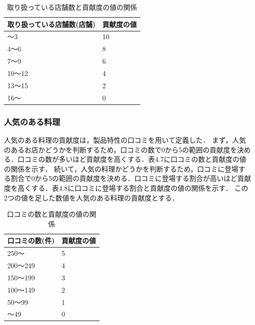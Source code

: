 \documentclass{funthesis}
\begin{document}
\begin{table}[htb]
  \begin{center}
  \scriptsize
    \caption{取り扱っている店舗数と貢献度の値の関係}
    \normalsize
   \begin{tabular}{p{6cm}|p{6cm}}
    \hline
取り扱っている店舗数(店舗) & 貢献度の値 \\ \hline\hline
      〜3 & 10  \\ \hline
      4〜6 & 8 \\ \hline
      7〜9 & 6 \\ \hline
      10〜12 & 4 \\ \hline
      13〜15 & 2 \\ \hline
     16〜 & 0 \\ \hline
  \end{tabular}
  \end{center}
\end{table}

\subsubsection{人気のある料理}
人気のある料理の貢献度は，製品特性の口コミを用いて定義した．
まず，人気のあるお店かどうかを判断するため，口コミの数で0から5の範囲の貢献度を決める．口コミの数が多いほど貢献度を高くする．表4.7に口コミの数と貢献度の値の関係を示す．
続いて，人気の料理かどうかを判断するため，口コミに登場する割合で0から5の範囲の貢献度を決める．口コミに登場する割合が高いほど貢献度を高くする．表4.8に口コミに登場する割合と貢献度の値の関係を示す．
この2つの値を足した数値を人気のある料理の貢献度とする．

\begin{table}[htb]
  \begin{center}
  \scriptsize
    \caption{口コミの数と貢献度の値の関係}
    \normalsize
   \begin{tabular}{p{6cm}|p{6cm}}
    \hline
口コミの数(件) & 貢献度の値 \\ \hline\hline
      250〜 & 5  \\ \hline
      200〜249 & 4 \\ \hline
      150〜199 & 3 \\ \hline
      100〜149 & 2 \\ \hline
      50〜99 & 1 \\ \hline
     〜49 & 0 \\ \hline
  \end{tabular}
  \end{center}
\end{table}
\end{document}
